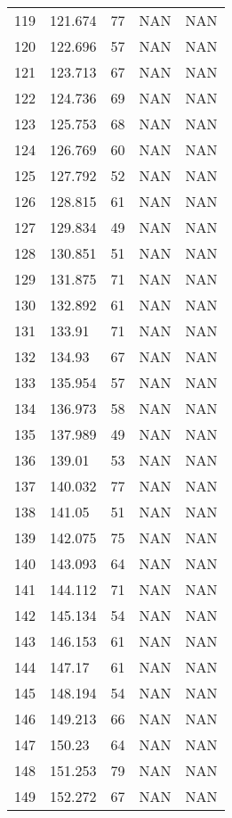 \documentclass{article}
\begin{document}
\begin{longtable}{@{}lllll@{}}
				119 & 121.674 & 77    & NAN   & NAN   \\
				120 & 122.696 & 57    & NAN   & NAN   \\
				121 & 123.713 & 67    & NAN   & NAN   \\
				122 & 124.736 & 69    & NAN   & NAN   \\
				123 & 125.753 & 68    & NAN   & NAN   \\
				124 & 126.769 & 60    & NAN   & NAN   \\
				125 & 127.792 & 52    & NAN   & NAN   \\
				126 & 128.815 & 61    & NAN   & NAN   \\
				127 & 129.834 & 49    & NAN   & NAN   \\
				128 & 130.851 & 51    & NAN   & NAN   \\
				129 & 131.875 & 71    & NAN   & NAN   \\
				130 & 132.892 & 61    & NAN   & NAN   \\
				131 & 133.91  & 71    & NAN   & NAN   \\
				132 & 134.93  & 67    & NAN   & NAN   \\
				133 & 135.954 & 57    & NAN   & NAN   \\
				134 & 136.973 & 58    & NAN   & NAN   \\
				135 & 137.989 & 49    & NAN   & NAN   \\
				136 & 139.01  & 53    & NAN   & NAN   \\
				137 & 140.032 & 77    & NAN   & NAN   \\
				138 & 141.05  & 51    & NAN   & NAN   \\
				139 & 142.075 & 75    & NAN   & NAN   \\
				140 & 143.093 & 64    & NAN   & NAN   \\
				141 & 144.112 & 71    & NAN   & NAN   \\
				142 & 145.134 & 54    & NAN   & NAN   \\
				143 & 146.153 & 61    & NAN   & NAN   \\
				144 & 147.17  & 61    & NAN   & NAN   \\
				145 & 148.194 & 54    & NAN   & NAN   \\
				146 & 149.213 & 66    & NAN   & NAN   \\
				147 & 150.23  & 64    & NAN   & NAN   \\
				148 & 151.253 & 79    & NAN   & NAN   \\
				149 & 152.272 & 67    & NAN   & NAN   \\

\end{longtable}
\end{document}
